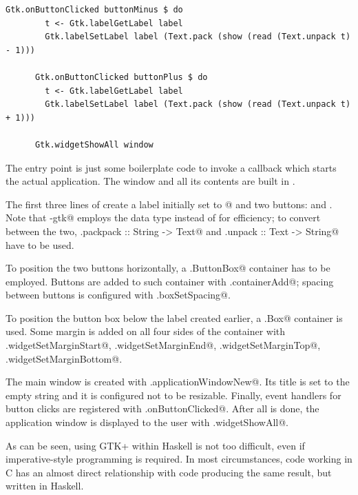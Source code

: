 \documentclass[UdineBachThesis,american,11pt]{PhdThesis}
\begin{document}
  \newpage

  \begin{lstlisting}[gobble=4,basicstyle=\ttfamily\small]
      Gtk.onButtonClicked buttonMinus $ do
        t <- Gtk.labelGetLabel label
        Gtk.labelSetLabel label (Text.pack (show (read (Text.unpack t) - 1)))

      Gtk.onButtonClicked buttonPlus $ do
        t <- Gtk.labelGetLabel label
        Gtk.labelSetLabel label (Text.pack (show (read (Text.unpack t) + 1)))

      Gtk.widgetShowAll window
  \end{lstlisting}

  The entry point \lstinline@main@ is just some boilerplate code to invoke a
  callback which starts the actual application. The window and all its contents
  are built in \lstinline@onActivate@.

  The first three lines of \lstinline@onActivate@ create a label initially set
  to @ and two buttons: \lstinline@buttonMinus@ and
  \lstinline@buttonPlus@. Note that \lstinline@gi-gtk@ employs the
  \lstinline@Text@ data type instead of \lstinline@String@ for efficiency;
  to convert between the two, \lstinline@Text.packpack :: String -> Text@ and
  \lstinline@Text.unpack :: Text -> String@ have to be used.

  To position the two buttons horizontally, a \lstinline@Gtk.ButtonBox@
  container has to be employed. Buttons are added to such container with
  \lstinline@Gtk.containerAdd@; spacing between buttons is configured with
  \lstinline@Gtk.boxSetSpacing@.

  To position the button box below the label created earlier, a
  \lstinline@Gtk.Box@ container is used. Some margin is added on all four sides
  of the container with \lstinline@Gtk.widgetSetMarginStart@,
  \lstinline@Gtk.widgetSetMarginEnd@, \lstinline@Gtk.widgetSetMarginTop@,
  \lstinline@Gtk.widgetSetMarginBottom@.

  The main window is created with \lstinline@Gtk.applicationWindowNew@. Its
  title is set to the empty string and it is configured not to be resizable.
  Finally, event handlers for button clicks are registered with
  \lstinline@Gtk.onButtonClicked@. After all is done, the application window is
  displayed to the user with \lstinline@Gtk.widgetShowAll@.

  As can be seen, using GTK+ within Haskell is not too difficult, even if
  imperative-style programming is required. In most circumstances, code working
  in C has an almost direct relationship with code producing the same result,
  but written in Haskell.
\end{document}
